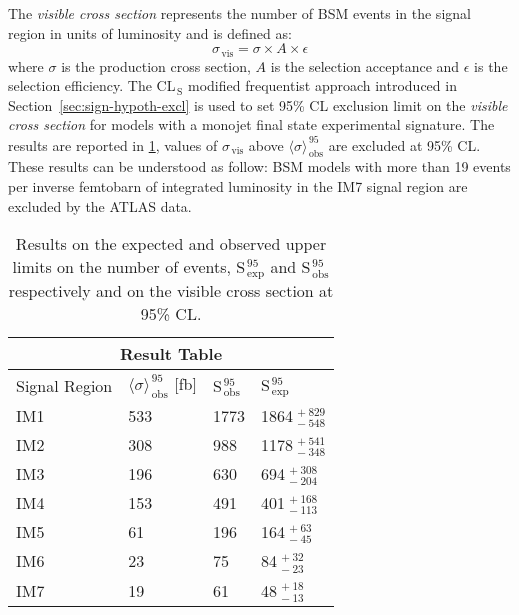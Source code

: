 The \emph{visible cross section} represents the number of BSM events in the
signal region in units of luminosity and is defined as:
\begin{equation}
  \label{eq:113}
  \sigma_\mathrm{\, vis} = \sigma \times A \times \epsilon
\end{equation}
where $\sigma$ is the production cross section, $A$ is the selection acceptance
and $\epsilon$ is the selection efficiency. The CL$_\mathrm{\, S}$ modified
frequentist approach introduced in Section~\ref{sec:sign-hypoth-excl} is used to
set 95\% CL exclusion limit on the \emph{visible cross section} for models with
a monojet final state experimental signature. The results are reported in
\cref{tab:cs_vis_results}, values of $\sigma_\mathrm{\, vis}$ above
$\langle \sigma \rangle_\mathrm{\, obs}^{\, 95}$ are excluded at 95\%
CL\@. These results can be understood as follow: BSM models with more than 19
events per inverse femtobarn of integrated luminosity in the IM7 signal region
are excluded by the ATLAS data.
\begin{table}[!h]
  \centering
  \begin{tabular}{llll}
    \toprule
    \multicolumn{4}{c}{Result Table} \\
    \midrule \midrule
    Signal Region & $\langle \sigma \rangle_\mathrm{\, obs}^{\, 95}$ [fb] & S$_\mathrm{\, obs}^{\, 95}$ & S$_\mathrm{\, exp}^{\, 95}$ \\
    \midrule
    IM1 & 533 & 1773 & 1864$_{\, -548}^{\, +829}$ \\
    IM2 & 308 & 988 & 1178$_{\, -348}^{\, +541}$ \\
    IM3 & 196 & 630 & 694$_{\, -204}^{\, +308}$ \\
    IM4 & 153 & 491 & 401$_{\, -113}^{\, +168}$ \\
    IM5 & 61 & 196 & 164$_{\, -45}^{\, +63}$ \\
    IM6 & 23 & 75 & 84$_{\, -23}^{\, +32}$ \\
    IM7 & 19 & 61 & 48$_{\, -13}^{\, +18}$ \\
    \bottomrule
  \end{tabular}
  \caption{Results on the expected and observed upper limits on the number of
    events, S$_\mathrm{\, exp}^{\, 95}$ and S$_\mathrm{\, obs}^{\, 95}$
    respectively and on the visible cross section at 95\% CL.}
  \label{tab:cs_vis_results}
\end{table}
